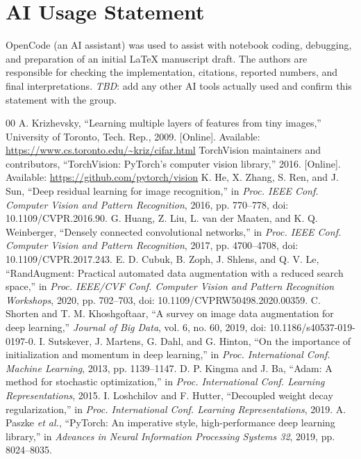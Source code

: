 \documentclass[conference,onecolumn]{IEEEtran}
\newcommand{\tbd}{\textit{TBD}}
\begin{document}
\section*{AI Usage Statement}
OpenCode (an AI assistant) was used to assist with notebook coding,
debugging, and preparation of an initial LaTeX manuscript draft. The
authors are responsible for checking the implementation, citations,
reported numbers, and final interpretations. \tbd{}: add any other AI
tools actually used and confirm this statement with the group.

\begin{thebibliography}{00}
 A. Krizhevsky, ``Learning multiple layers of features from tiny images,'' University of Toronto, Tech. Rep., 2009. [Online]. Available: \url{https://www.cs.toronto.edu/~kriz/cifar.html}
 TorchVision maintainers and contributors, ``TorchVision: PyTorch's computer vision library,'' 2016. [Online]. Available: \url{https://github.com/pytorch/vision}
 K. He, X. Zhang, S. Ren, and J. Sun, ``Deep residual learning for image recognition,'' in \emph{Proc. IEEE Conf. Computer Vision and Pattern Recognition}, 2016, pp. 770--778, doi: 10.1109/CVPR.2016.90.
 G. Huang, Z. Liu, L. van der Maaten, and K. Q. Weinberger, ``Densely connected convolutional networks,'' in \emph{Proc. IEEE Conf. Computer Vision and Pattern Recognition}, 2017, pp. 4700--4708, doi: 10.1109/CVPR.2017.243.
 E. D. Cubuk, B. Zoph, J. Shlens, and Q. V. Le, ``RandAugment: Practical automated data augmentation with a reduced search space,'' in \emph{Proc. IEEE/CVF Conf. Computer Vision and Pattern Recognition Workshops}, 2020, pp. 702--703, doi: 10.1109/CVPRW50498.2020.00359.
 C. Shorten and T. M. Khoshgoftaar, ``A survey on image data augmentation for deep learning,'' \emph{Journal of Big Data}, vol. 6, no. 60, 2019, doi: 10.1186/s40537-019-0197-0.
 I. Sutskever, J. Martens, G. Dahl, and G. Hinton, ``On the importance of initialization and momentum in deep learning,'' in \emph{Proc. International Conf. Machine Learning}, 2013, pp. 1139--1147.
 D. P. Kingma and J. Ba, ``Adam: A method for stochastic optimization,'' in \emph{Proc. International Conf. Learning Representations}, 2015.
 I. Loshchilov and F. Hutter, ``Decoupled weight decay regularization,'' in \emph{Proc. International Conf. Learning Representations}, 2019.
 A. Paszke \emph{et al.}, ``PyTorch: An imperative style, high-performance deep learning library,'' in \emph{Advances in Neural Information Processing Systems 32}, 2019, pp. 8024--8035.
\end{thebibliography}
\end{document}
